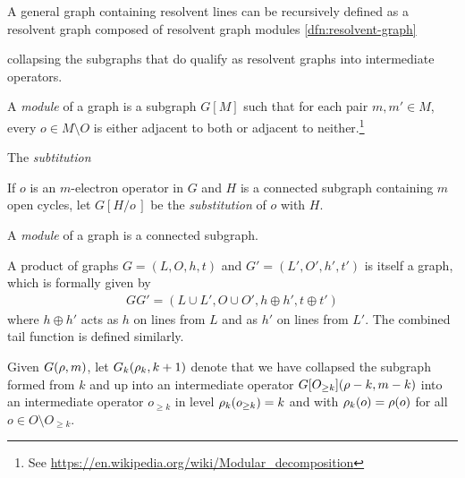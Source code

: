 \documentclass[11pt]{article}
\numberwithin{equation}{section}
\begin{document}
\begin{dfn}

\end{dfn}

\begin{rmk}
A general graph containing resolvent lines can be recursively defined as a resolvent graph composed of resolvent graph modules \cref{dfn:resolvent-graph} 

collapsing the subgraphs that do qualify as resolvent graphs into intermediate operators.
\end{rmk}

\begin{dfn}
A \textit{module} of a graph is a subgraph $G[M]$ such that for each pair $m,m'\in M$, every $o\in M\setminus O$ is either adjacent to both or adjacent to neither.\footnote{See \url{https://en.wikipedia.org/wiki/Modular_decomposition}}
\end{dfn}

\begin{dfn}
The \textit{subtitution} 
\end{dfn}

\begin{dfn}
If $o$ is an $m$-electron operator in $G$ and $H$ is a connected subgraph containing $m$ open cycles, let $G[H/o\,]$ be the \textit{substitution} of $o$ with $H$.
\end{dfn}


\begin{dfn}
A \textit{module} of a graph is a connected subgraph.

\end{dfn}

\begin{rmk}
A product of graphs $G=(L,O,h,t)$ and $G'=(L',O',h',t')$ is itself a graph, which is formally given by
\begin{align}
  GG'
=
  (L\cup L', O\cup O', h\oplus h', t\oplus t')
\end{align}
where $h\oplus h'$ acts as $h$ on lines from $L$ and as $h'$ on lines from $L'$.
The combined tail function is defined similarly.
\end{rmk}

\begin{ntt}
Given
$
  G(\rho ,m)
$,
let
$
  G_k(\rho _k,k+1)
$
denote that we have collapsed the subgraph formed from $k$ and up into an intermediate operator
$
  G[O_{\geq k}](\rho -k,m-k)
$
into an intermediate operator
$
  o_{\geq k}
$
in level
$
  \rho _k(o_{\geq k})
=
  k
$
and with
$
  \rho _k(o)
=
  \rho (o)
$
for all
$
  o
\in
  O
  \setminus
  O_{\geq k}
$.
\end{ntt}
\end{document}
